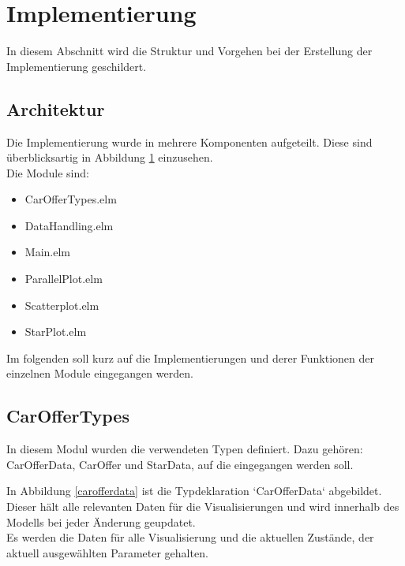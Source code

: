 \section{Implementierung}

In diesem Abschnitt wird die Struktur und Vorgehen bei der Erstellung der Implementierung geschildert.

\subsection{Architektur}

Die Implementierung wurde in mehrere Komponenten aufgeteilt. Diese sind überblicksartig in Abbildung \ref*{fig:compontents} einzusehen. \\
Die Module sind: \\

\begin{itemize}
    \item CarOfferTypes.elm
    \item DataHandling.elm
    \item Main.elm
    \item ParallelPlot.elm
    \item Scatterplot.elm
    \item StarPlot.elm
\end{itemize}

Im folgenden soll kurz auf die Implementierungen und derer Funktionen der einzelnen Module eingegangen werden. \\

\begin{figure}
    \centering
    \label{fig:compontents}
\end{figure}

\subsection{CarOfferTypes}

In diesem Modul wurden die verwendeten Typen definiert. Dazu gehören: CarOfferData, CarOffer und StarData, auf die eingegangen werden soll.

In Abbildung \ref{carofferdata} ist die Typdeklaration `CarOfferData` abgebildet. Dieser hält alle relevanten Daten für die Visualisierungen und wird innerhalb des Modells bei jeder Änderung geupdatet. \\
Es werden die Daten für alle Visualisierung und die aktuellen Zustände, der aktuell ausgewählten Parameter gehalten. \\

